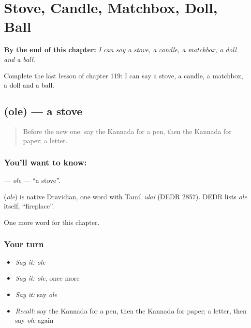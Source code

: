 
\chapter{Stove, Candle, Matchbox, Doll, Ball}
\label{ch:ka-stove-candle-matchbox-doll-ball}

\begin{chapteropening}
\textbf{By the end of this chapter:} \emph{I can say a stove, a candle, a matchbox, a doll and a ball.}

Complete the last lesson of chapter 119: I can say a stove, a candle, a matchbox, a doll and a ball.
\end{chapteropening}

\section[\texorpdfstring{\kn{ಒಲೆ} (ole)}{ಒಲೆ (ole)}]{ (ole) — a stove}

\label{lesson:KA-C119-ole}



\begin{quote}
Before the new one: say the Kannada for a pen, then the Kannada for paper; a letter.
\end{quote}

\subsection*{You'll want to know: }
\textbf{} — \emph{ole} — \textquotedblleft{}a stove\textquotedblright{}.

\begin{cousinweb}
\textbf{} (\emph{ole}) is native Dravidian, one word with Tamil \emph{ulai} (DEDR 2857). DEDR lists \emph{ole} itself, \textquotedblleft{}fireplace\textquotedblright{}.
\end{cousinweb}

\begin{grammarlens}[title={What you've built}]
One more word for this chapter.
\end{grammarlens}

\subsection*{Your turn}
\begin{itemize}
\raggedright
  \item \emph{Say it:} \emph{ole}
  \item \emph{Say it:} \emph{ole}, once more
  \item \emph{Say it:} say \emph{ole}
  \item \emph{Recall:} say the Kannada for a pen, then the Kannada for paper; a letter, then say \emph{ole} again
\end{itemize}

